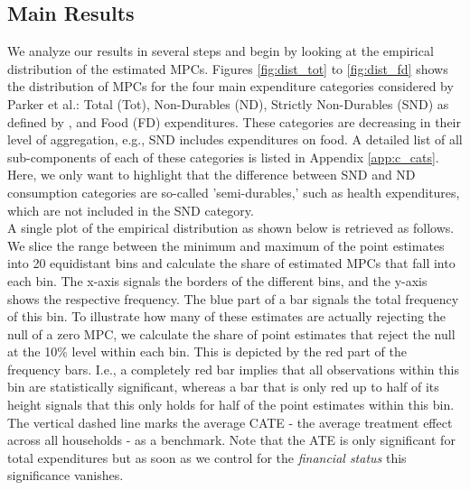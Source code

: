 \subsection{Main Results} \label{subsec:main_res}
We analyze our results in several steps and begin by looking at the empirical distribution of the estimated MPCs. Figures \ref{fig:dist_tot} to \ref{fig:dist_fd} shows the distribution of MPCs for the four main expenditure categories considered by Parker et al.: Total (Tot), Non-Durables (ND), Strictly Non-Durables (SND) as defined by \cite{lusardi_1996}, and Food (FD) expenditures. These categories are decreasing in their level of aggregation, e.g., SND includes expenditures on food. A detailed list of all sub-components of each of these categories is listed in Appendix \ref{app:c_cats}. Here, we only want to highlight that the difference between SND and ND consumption categories are so-called 'semi-durables,' such as health expenditures, which are not included in the SND category. \\

\noindent A single plot of the empirical distribution as shown below is retrieved as follows. We slice the range between the minimum and maximum of the point estimates into 20 equidistant bins and calculate the share of estimated MPCs that fall into each bin. The x-axis signals the borders of the different bins, and the y-axis shows the respective frequency. The blue part of a bar signals the total frequency of this bin. To illustrate how many of these estimates are actually rejecting the null of a zero MPC, we calculate the share of point estimates that reject the null at the 10\% level within each bin. This is depicted by the red part of the frequency bars. I.e., a completely red bar implies that all observations within this bin are statistically significant, whereas a bar that is only red up to half of its height signals that this only holds for half of the point estimates within this bin. The vertical dashed line marks the average CATE - the average treatment effect across all households - as a benchmark. Note that the ATE is only significant for total expenditures but as soon as we control for the \textit{financial status} this significance vanishes. \\ 
